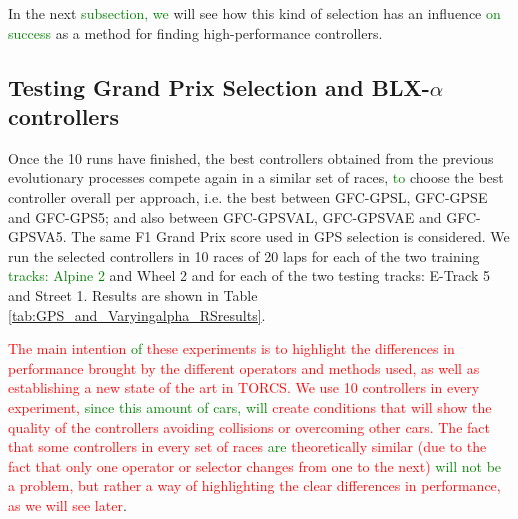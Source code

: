 \documentclass[10pt,journal,compsoc]{IEEEtran}
\begin{document}
In the next  \textcolor{green}{subsection, we} will see how this kind of selection has an influence \textcolor{green}{on success} as a method for finding high-performance controllers.



\subsection{Testing Grand Prix Selection and BLX-$\alpha$ controllers}

Once the 10 runs have finished, the best controllers obtained from the
previous evolutionary processes compete again in a similar set of
races,  \textcolor{green}{to} choose the best controller overall per approach,
i.e. the best between {\sf GFC-GPSL}, {\sf GFC-GPSE} and {\sf
  GFC-GPS5}; and also between {\sf GFC-GPSVAL}, {\sf GFC-GPSVAE} and
{\sf GFC-GPSVA5}. The same F1 Grand Prix score used in GPS selection
is considered. We run the selected controllers in 10 races of 20 laps
for each of the two training  \textcolor{green}{tracks: Alpine 2}  and Wheel 2  and  for
each of the two testing tracks: E-Track 5 and Street 1. Results are
shown in Table \ref{tab:GPS_and_Varyingalpha_RSresults}.

\textcolor{red}{The main intention \textcolor{green}{of} these experiments is to
  highlight the differences in performance brought by the different
  operators and methods used, as well as establishing a new state of
  the art in TORCS. We use 10 controllers in every experiment,  \textcolor{green}{since
  this amount of cars, will} create conditions that will show the
  quality of the controllers avoiding collisions or overcoming other
  cars. The fact that some controllers in every set of races  \textcolor{green}{are} theoretically similar (due to the fact that only one operator or selector changes from one to the next)  \textcolor{green}{will not be} a problem, but rather a way of highlighting the clear differences in
  performance, as we will see later}.
\end{document}
